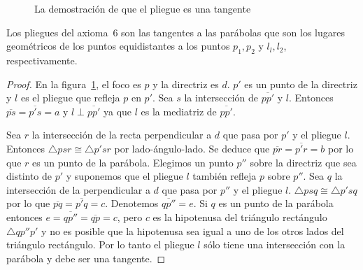 \begin{figure}[thb]
\begin{center}
\end{center}
\caption{La demostración de que el pliegue es una tangente}\label{f.tangent-proof}
\end{figure}

\begin{theorem}\label{thm.parabola-tangents}
Los pliegues del axioma~$6$ son las tangentes a las parábolas que son los lugares geométricos de los puntos equidistantes a los puntos $p_1,p_2$ y $l_l,l_2$, respectivamente.
\end{theorem}
\begin{proof}
En la figura~\ref{f.tangent-proof}, el foco es $p$ y la directriz es $d$. $p'$ es un punto de la directriz y $l$ es el pliegue que refleja $p$ en $p'$. Sea $s$ la intersección de $\overline{pp'}$ y $l$. Entonces $\overline{ps}=\overline{p's}=a$ y $l\perp \overline{pp'}$ ya que $l$ es la mediatriz de $\overline{pp'}$.

Sea $r$ la intersección de la recta perpendicular a $d$ que pasa por $p'$ y el pliegue $l$. Entonces $\triangle psr\cong \triangle p'sr$ por lado-ángulo-lado. Se deduce que 
$\overline{pr}=\overline{p'r}=b$ por lo que $r$ es un punto de la parábola. Elegimos un punto $p''$ sobre la directriz que sea distinto de $p'$ y suponemos que el pliegue $l$ también refleja $p$ sobre $p''$. Sea $q$ la intersección de la perpendicular a $d$ que pasa por $p''$ y el pliegue $l$. $\triangle psq\cong \triangle p'sq$ por lo que $\overline{pq}=\overline{p'q}=c$. Denotemos $\overline{qp''}=e$. Si $q$ es un punto de la parábola entonces $e=\overline{qp''}=\overline{qp}=c$, pero $c$ es la hipotenusa del triángulo rectángulo $\triangle qp''p'$ y no es posible que la hipotenusa sea igual a uno de los otros lados del triángulo rectángulo. Por lo tanto el pliegue $l$ sólo tiene una intersección con la parábola y debe ser una tangente.
\end{proof}

